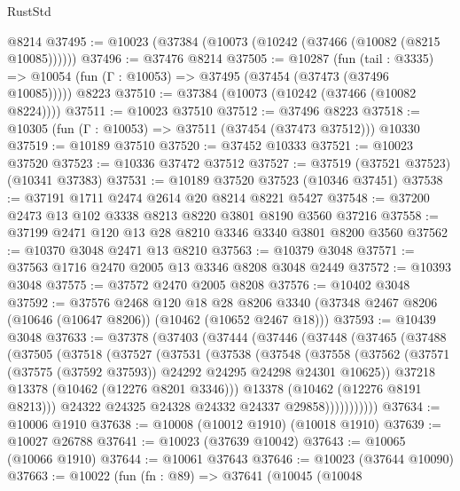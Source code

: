 \begin{lexlean}{RustStd}
\begin{coremodule}
    @8214
@37495 := @10023 (@37384 (@10073 (@10242 (@37466 (@10082 (@8215 @10085))))))
@37496 := @37476 @8214
@37505 := @10287
    (fun (tail : @3335) => @10054 (fun (Γ : @10053) => @37495 (@37454 (@37473 (@37496 @10085)))))
    @8223
@37510 := @37384 (@10073 (@10242 (@37466 (@10082 @8224))))
@37511 := @10023 @37510
@37512 := @37496 @8223
@37518 := @10305 (fun (Γ : @10053) => @37511 (@37454 (@37473 @37512))) @10330
@37519 := @10189 @37510
@37520 := @37452 @10333
@37521 := @10023 @37520
@37523 := @10336 @37472 @37512
@37527 := @37519 (@37521 @37523) (@10341 @37383)
@37531 := @10189 @37520 @37523 (@10346 @37451)
@37538 := @37191 @1711 @2474 @2614 @20 @8214 @8221 @5427
@37548 := @37200 @2473 @13 @102 @3338 @8213 @8220 @3801 @8190 @3560 @37216
@37558 := @37199 @2471 @120 @13 @28 @8210 @3346 @3340 @3801 @8200 @3560
@37562 := @10370 @3048 @2471 @13 @8210
@37563 := @10379 @3048
@37571 := @37563 @1716 @2470 @2005 @13 @3346 @8208 @3048 @2449
@37572 := @10393 @3048
@37575 := @37572 @2470 @2005 @8208
@37576 := @10402 @3048
@37592 := @37576
    @2468
    @120
    @18
    @28
    @8206
    @3340
    (@37348 @2467 @8206 (@10646 (@10647 @8206)) (@10462 (@10652 @2467 @18)))
@37593 := @10439 @3048
@37633 := @37378
    (@37403
      (@37444
        (@37446
          (@37448
            (@37465
              (@37488
                (@37505
                  (@37518
                    (@37527
                      (@37531
                        (@37538
                          (@37548
                            (@37558
                              (@37562
                                (@37571
                                  (@37575 (@37592 @37593))
                                  @24292
                                  @24295
                                  @24298
                                  @24301
                                  @10625))
                              @37218
                              @13378
                              (@10462 (@12276 @8201 @3346)))
                            @13378
                            (@10462 (@12276 @8191 @8213)))
                          @24322
                          @24325
                          @24328
                          @24332
                          @24337
                          @29858)))))))))))
@37634 := @10006 @1910
@37638 := @10008 (@10012 @1910) (@10018 @1910)
@37639 := @10027 @26788
@37641 := @10023 (@37639 @10042)
@37643 := @10065 (@10066 @1910)
@37644 := @10061 @37643
@37646 := @10023 (@37644 @10090)
@37663 := @10022
    (fun (fn : @89) =>
    @37641
      (@10045
        (@10048

\end{coremodule}
\end{lexlean}
